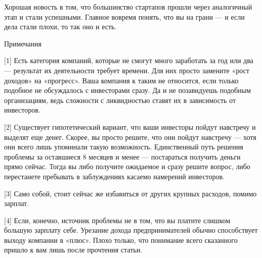 \documentclass[ebook,12pt,oneside,openany]{memoir}
\begin{document}
Хорошая новость в том, что большинство стартапов прошли через
аналогичный этап и стали успешными. Главное вовремя понять, что вы на
грани — и если дела стали плохи, то так оно и есть.

Примечания

[1] Есть категория компаний, которые не смогут много заработать за год
или два — результат их деятельности требует времени. Для них просто
замените «рост доходов» на «прогресс». Ваша компания к таким не
относится, если только подобное не обсуждалось с инвесторами сразу. Да
и не позавидуешь подобным организациям, ведь сложности с ликвидностью
ставят их в зависимость от инвесторов.

[2] Существует гипотетический вариант, что ваши инвесторы пойдут
навстречу и выделят еще денег. Скорее, вы просто решите, что они
пойдут навстречу — хотя они всего лишь упоминали такую возможность.
Единственный путь решения проблемы за оставшиеся 8 месяцев и менее —
постараться получить деньги прямо сейчас. Тогда вы либо получите
ожидаемое и сразу решите вопрос, либо перестанете пребывать в
заблуждениях касаемо намерений инвесторов.

[3] Само собой, стоит сейчас же избавиться от других крупных расходов,
помимо зарплат.

[4] Если, конечно, источник проблемы не в том, что вы платите слишком
большую зарплату себе. Урезание дохода предпринимателей обычно
способствует выходу компании в «плюс». Плохо только, что понимание
всего сказанного пришло к вам лишь после прочтения статьи.
\end{document}
